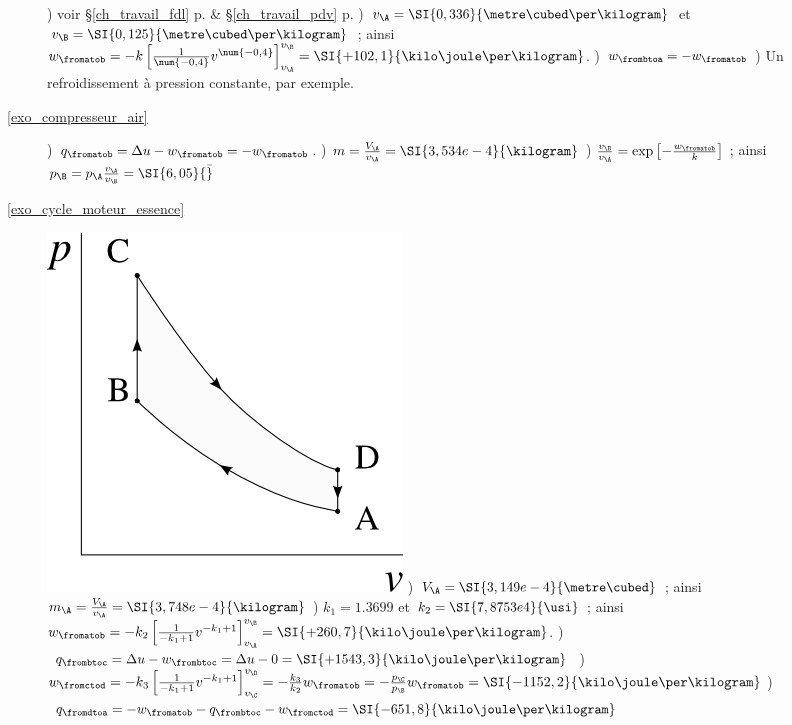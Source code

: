 \begin{description}
					) voir \S\ref{ch_travail_fdl} p.\pageref{ch_travail_fdl} \& \S\ref{ch_travail_pdv} p.\pageref{ch_travail_pdv}
					) $v_\A = \SI{0,336}{\metre\cubed\per\kilogram}$ et $v_\B = \SI{0,125}{\metre\cubed\per\kilogram}$ ; ainsi $w_\fromatob = -k \left[\frac{1}{\num{-0,4}} v^{\num{-0,4}}\right]_{v_\A}^{v_\B } = \SI{+102,1}{\kilo\joule\per\kilogram}$.
					) $w_\frombtoa =  - w_\fromatob$
					) Un refroidissement à pression constante, par exemple.
	\item [\ref{exo_compresseur_air}]
					) $q_\fromatob = \Delta u - w_\fromatob = - w_\fromatob$.
					) $m = \frac{V_\A}{v_\A} = \SI{3,534e-4}{\kilogram}$
					) $\frac{v_\B }{v_\A} = \exp \left[-\frac{w_\fromatob}{k}\right]$ ; ainsi $p_\B = p_\A \frac{v_\A}{v_\B } = \SI{6,05}{\bar}$
	\item [\ref{exo_cycle_moteur_essence}]
					\includegraphics[width=\solutiondiagramwidth]{images/exo_sol_pv_moteur_essence.png}
					) $V_\A = \SI{3,149e-4}{\metre\cubed}$ ; ainsi $m_\A = \frac{V_\A}{v_\A} = \SI{3,748e-4}{\kilogram}$
					) $k_1 = \num{1,3699}$ et $k_2 = \SI{7,8753e4}{\usi}$ ; ainsi $w_\fromatob = -k_2 \left[\frac{1}{-k_1 + 1} v^{-k_1 + 1} \right]_{v_\A}^{v_\B } = \SI{+260,7}{\kilo\joule\per\kilogram}$.
					) $q_\frombtoc = \Delta u - w_\frombtoc = \Delta u - 0 = \SI{+1543,3}{\kilo\joule\per\kilogram}$
					) $w_\fromctod = -k_3 \left[\frac{1}{-k_1 + 1} v^{-k_1 + 1} \right]_{v_\C}^{v_\D} = -\frac{k_3}{k_2} w_\fromatob = -\frac{p_\C}{p_\B } w_\fromatob = \SI{-1152,2}{\kilo\joule\per\kilogram}$
					) $q_\fromdtoa = -w_\fromatob - q_\frombtoc - w_\fromctod = \SI{-651,8}{\kilo\joule\per\kilogram}$

\end{description}

